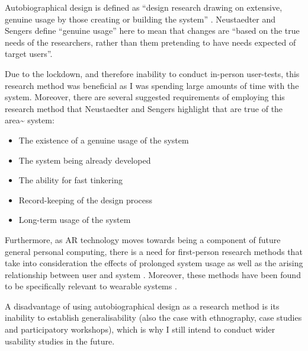 Autobiographical design is defined as “design research drawing on extensive, genuine usage by those creating or building the system” \citep{neustaedter2012}. Neustaedter and Sengers define “genuine usage” here to mean that changes are “based on the true needs of the researchers, rather than them pretending to have needs expected of target users”.

Due to the lockdown, and therefore inability to conduct in-person user-tests, this research method was beneficial as I was spending large amounts of time with the system. Moreover, there are several suggested requirements of employing this research method that Neustaedter and Sengers highlight that are true of the area\textasciitilde{} system:
\begin{itemize}
    \item The existence of a genuine usage of the system
    \item The system being already developed
    \item The ability for fast tinkering 
    \item Record-keeping of the design process
    \item Long-term usage of the system
\end{itemize}
Furthermore, as AR technology moves towards being a component of future general personal computing, there is a need for first-person research methods that take into consideration the effects of prolonged system usage as well as the arising relationship between user and system \citep{desjardins2018}. Moreover, these methods have been found to be specifically relevant to wearable systems \citep{cecchinato2017}.

A disadvantage of using autobiographical design as a research method is its inability to establish generalisability (also the case with ethnography, case studies and participatory workshops), which is why I still intend to conduct wider usability studies in the future.

